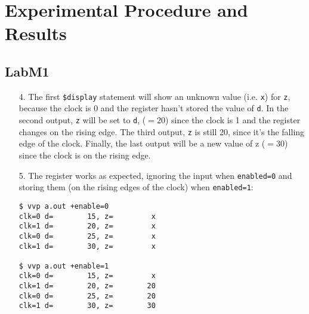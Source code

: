 \documentclass{article}
\begin{document}

\section{Experimental Procedure and Results}

\subsection{LabM1}
\begin{enumerate}
\item[4. ] The first \verb#$display# statement will show an unknown value
(i.e. \verb$x$) for \verb$z$, because the clock is 0 and the register hasn't
stored the value of \verb$d$. In the second output, \verb$z$ will be set to
\verb$d$, ($= 20$) since the clock is 1 and the register changes on the rising
edge. The third output, \verb$z$ is still 20, since it's the falling edge of the
clock. Finally, the last output will be a new value of z ($= 30$) since the clock
is on the rising edge.

\item[5. ] The register works as expected, ignoring the input when \verb$enabled=0$
and storing them (on the rising edges of the clock) when \verb$enabled=1$:
\begin{verbatim}
$ vvp a.out +enable=0
clk=0 d=        15, z=         x
clk=1 d=        20, z=         x
clk=0 d=        25, z=         x
clk=1 d=        30, z=         x

$ vvp a.out +enable=1
clk=0 d=        15, z=         x
clk=1 d=        20, z=        20
clk=0 d=        25, z=        20
clk=1 d=        30, z=        30
\end{verbatim}
\end{enumerate}
\end{document}

